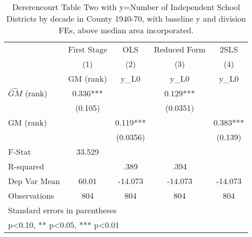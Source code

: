 \begin{table}[htbp]\centering
\def\sym#1{\ifmmode^{#1}\else\(^{#1}\)\fi}
\caption{Dererencourt Table Two with y=Number of Independent School Districts by decade in County 1940-70, with baseline y and division FEs, above median area incorporated.}
\begin{tabular}{l*{4}{c}}
\toprule
                    & First Stage   &         OLS   &Reduced Form   &        2SLS   \\
                    &\multicolumn{1}{c}{(1)}&\multicolumn{1}{c}{(2)}&\multicolumn{1}{c}{(3)}&\multicolumn{1}{c}{(4)}\\
                    &\multicolumn{1}{c}{GM  (rank)}&\multicolumn{1}{c}{y\_L0}&\multicolumn{1}{c}{y\_L0}&\multicolumn{1}{c}{y\_L0}\\
\midrule
$\hat{GM}$ (rank)   &       0.336***&               &       0.129***&               \\
                    &     (0.105)   &               &    (0.0351)   &               \\
\addlinespace
GM  (rank)          &               &       0.119***&               &       0.383***\\
                    &               &    (0.0356)   &               &     (0.139)   \\
\midrule
F-Stat              &      33.529   &               &               &               \\
R-squared           &               &        .389   &        .394   &               \\
Dep Var Mean        &       60.01   &     -14.073   &     -14.073   &     -14.073   \\
Observations        &         804   &         804   &         804   &         804   \\
\bottomrule
\multicolumn{5}{l}{\footnotesize Standard errors in parentheses}\\
\multicolumn{5}{l}{\footnotesize * p<0.10, ** p<0.05, *** p<0.01}\\
\end{tabular}
\end{table}
